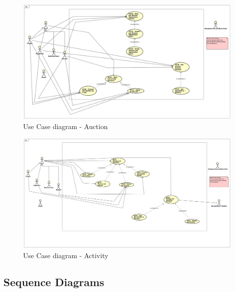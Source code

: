 	
				\begin{figure}[H]
					\includegraphics[width=\linewidth]{diagrams/uc-diag3-auction.png}
					\caption{Use Case diagram - Auction}
					\label{fig:uc_diag_3_auction}
				\end{figure}
			
				\begin{figure}[H]
					\includegraphics[width=\linewidth]{diagrams/uc-diag4-activity.png}
					\caption{Use Case diagram - Activity}
					\label{fig:uc_diag_4_activity}
				\end{figure}
			
			\eject

			\subsection{Sequence Diagrams}
								
